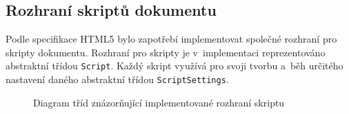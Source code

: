 \subsection{Rozhraní skriptů dokumentu}
\label{Chapter.Implementation.ScriptInterface}

Podle specifikace HTML5 bylo zapotřebí implementovat společné rozhraní pro skripty dokumentu. Rozhraní pro skripty je v~implementaci reprezentováno abstraktní třídou \texttt{Script}. Každý skript využívá pro svoji tvorbu a~běh určitého nastavení daného abstraktní třídou \texttt{ScriptSettings}. 

\begin{figure}[H]
  \begin{center}
    \caption{Diagram tříd znázorňující implementované rozhraní skriptu}
    \label{Figure.ScriptInterface}
  \end{center}
\end{figure}

